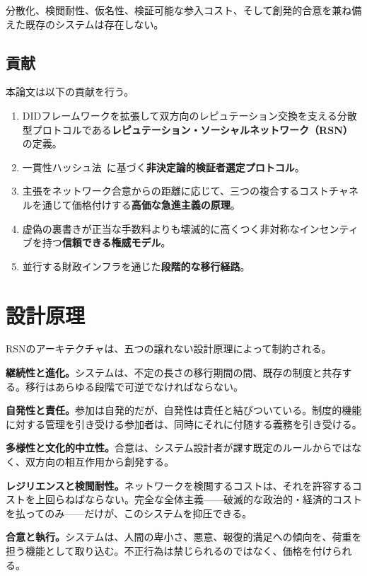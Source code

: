 \documentclass[11pt,a4paper,twocolumn]{article}
\begin{document}
分散化、検閲耐性、仮名性、検証可能な参入コスト、そして創発的合意を兼ね備えた既存のシステムは存在しない。

\subsection{貢献}

本論文は以下の貢献を行う。
\begin{enumerate}[nosep]
\item DIDフレームワークを拡張して双方向のレピュテーション交換を支える分散型プロトコルである\textbf{レピュテーション・ソーシャルネットワーク（RSN）}の定義。
\item 一貫性ハッシュ法~\cite{karger1997}に基づく\textbf{非決定論的検証者選定プロトコル}。
\item 主張をネットワーク合意からの距離に応じて、三つの複合するコストチャネルを通じて価格付けする\textbf{高価な急進主義の原理}。
\item 虚偽の裏書きが正当な手数料よりも壊滅的に高くつく非対称なインセンティブを持つ\textbf{信頼できる権威モデル}。
\item 並行する財政インフラを通じた\textbf{段階的な移行経路}。
\end{enumerate}

\section{設計原理}

RSNのアーキテクチャは、五つの譲れない設計原理によって制約される。

\textbf{継続性と進化。}システムは、不定の長さの移行期間の間、既存の制度と共存する。移行はあらゆる段階で可逆でなければならない。

\textbf{自発性と責任。}参加は自発的だが、自発性は責任と結びついている。制度的機能に対する管理を引き受ける参加者は、同時にそれに付随する義務を引き受ける。

\textbf{多様性と文化的中立性。}合意は、システム設計者が課す既定のルールからではなく、双方向の相互作用から創発する。

\textbf{レジリエンスと検閲耐性。}ネットワークを検閲するコストは、それを許容するコストを上回らねばならない。完全な全体主義——破滅的な政治的・経済的コストを払ってのみ——だけが、このシステムを抑圧できる。

\textbf{合意と執行。}システムは、人間の卑小さ、悪意、報復的満足への傾向を、荷重を担う機能として取り込む。不正行為は禁じられるのではなく、価格を付けられる。
\end{document}
